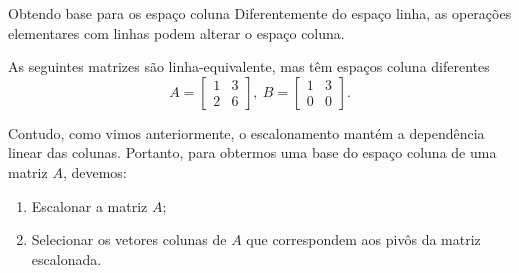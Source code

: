 \begin{frame}[label=lild]{Obtendo base para os espaço coluna}
Diferentemente do espaço linha, as operações elementares com linhas podem alterar o espaço coluna. 

\begin{exe}
As seguintes matrizes são linha-equivalente, mas têm espaços coluna diferentes
\[
A=\begin{bmatrix}
1 & 3\\ 2& 6
\end{bmatrix},\ 
B=\begin{bmatrix}
1 & 3\\ 0 & 0
\end{bmatrix}.
\]
\end{exe}

Contudo, como vimos anteriormente,  o escalonamento {\color{red} mantém a dependência linear} das colunas. Portanto, para obtermos uma base do espaço coluna de uma matriz \(A\), devemos:
\begin{enumerate}
\item Escalonar a matriz \(A\);
\item Selecionar os vetores colunas de \(A\) que correspondem aos pivôs da matriz escalonada.
\end{enumerate}
\end{frame}


%
%
%




